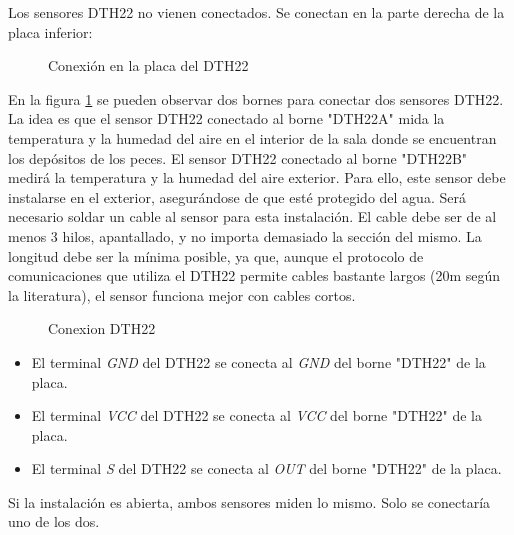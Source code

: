 Los sensores DTH22 no vienen conectados. Se conectan en la parte derecha de la placa inferior:

\begin{figure}[htbp!]
\caption{Conexión en la placa del DTH22}\label{placa:acuacol:derecha}
\end{figure}

En la figura \ref{placa:acuacol:derecha} se pueden observar dos bornes para conectar dos sensores DTH22. La idea es que el sensor DTH22 conectado al borne "DTH22A" mida la temperatura y la humedad del aire en el interior de la sala donde se encuentran los depósitos de los peces. El sensor DTH22 conectado al borne "DTH22B" medirá la temperatura y la humedad del aire exterior. Para ello, este sensor debe instalarse en el exterior, asegurándose de que esté protegido del agua. Será necesario soldar un cable al sensor para esta instalación. El cable debe ser de al menos 3 hilos, apantallado, y no importa demasiado la sección del mismo. La longitud debe ser la mínima posible, ya que, aunque el protocolo de comunicaciones que utiliza el DTH22 permite cables bastante largos (20m según la literatura), el sensor funciona mejor con cables cortos.

\begin{figure}[htbp!]
\caption{Conexion DTH22}\label{modulo:dth22}
\end{figure}

\begin{itemize}
\item El terminal \emph{GND} del DTH22 se conecta al \emph{GND} del borne "DTH22" de la placa.
\item El terminal \emph{VCC} del DTH22 se conecta al \emph{VCC} del borne "DTH22" de la placa.
\item El terminal \emph{S} del DTH22 se conecta al \emph{OUT} del borne "DTH22" de la placa.
\end{itemize}

Si la instalación es abierta, ambos sensores miden lo mismo. Solo se conectaría uno de los dos.

